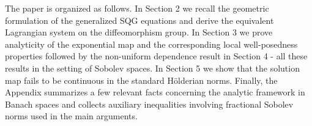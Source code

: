 \documentclass[11pt]{amsart}
\newtheorem{theorem}{Theorem}%
\numberwithin{equation}{section}
\begin{document}


The paper is organized as follows. 
In Section 2 we recall the geometric formulation of the generalized SQG equations and derive the equivalent Lagrangian system on the diffeomorphism group. 
In Section 3 we prove analyticity 
of the exponential map and the corresponding 
local well-posedness properties 
followed by the non-uniform dependence result 
in Section 4
- all these results in the setting of Sobolev spaces. 
In Section 5 we show that the solution map fails to be continuous in the standard H\"olderian norms. 
Finally, the Appendix summarizes a few relevant facts 
concerning the analytic framework in Banach spaces and collects auxiliary inequalities involving fractional Sobolev norms used in the main arguments.
\end{document}
